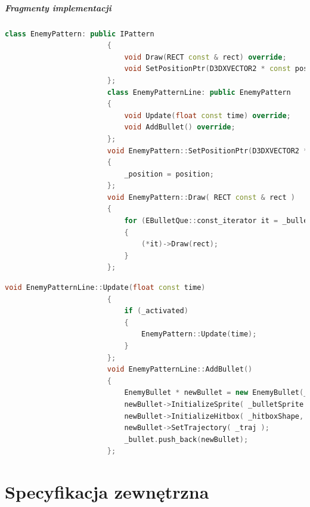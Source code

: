 \documentclass[a4paper,twoside]{article}
\begin{document}
					\subsubsection{Fragmenty implementacji}
					\begin{lstlisting}[language=C++]
						class EnemyPattern: public IPattern
						{
							void Draw(RECT const & rect) override;
							void SetPositionPtr(D3DXVECTOR2 * const position) override;
						};
						class EnemyPatternLine: public EnemyPattern
						{
							void Update(float const time) override;
							void AddBullet() override;
						};
						void EnemyPattern::SetPositionPtr(D3DXVECTOR2 * const position)
						{
							_position = position;
						};
						void EnemyPattern::Draw( RECT const & rect )
						{
							for (EBulletQue::const_iterator it = _bullet.begin(); it != _bullet.end(); it++)
							{
								(*it)->Draw(rect);
							}
						};
					\end{lstlisting}
					\begin{lstlisting}[language=C++]
						void EnemyPatternLine::Update(float const time)
						{
							if (_activated)
							{
								EnemyPattern::Update(time);
							}
						};
						void EnemyPatternLine::AddBullet()
						{
							EnemyBullet * newBullet = new EnemyBullet(_bulletSpeed, _bulletAcc);
							newBullet->InitializeSprite( _bulletSprite );
							newBullet->InitializeHitbox( _hitboxShape, _hitboxSize );
							newBullet->SetTrajectory( _traj );
							_bullet.push_back(newBullet);
						};
					\end{lstlisting}
	\newpage
	\part{\huge \textbf{Specyfikacja zewnętrzna}}
\end{document}

